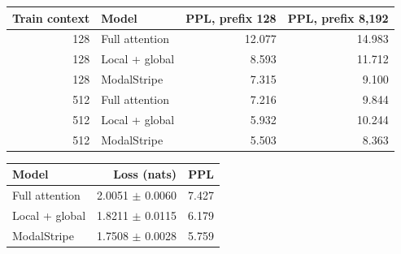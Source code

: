 \documentclass[11pt,letterpaper]{article}
\begin{document}
\begin{center}\begin{minipage}{\textwidth}\centering\small
{}

\begin{tabular}{rlrr}\toprule
Train context & Model & PPL, prefix 128 & PPL, prefix 8,192\\\midrule
128 & Full attention & 12.077 & 14.983 \\
128 & Local + global & 8.593 & 11.712 \\
128 & ModalStripe & 7.315 & 9.100 \\
512 & Full attention & 7.216 & 9.844 \\
512 & Local + global & 5.932 & 10.244 \\
512 & ModalStripe & 5.503 & 8.363 \\
\bottomrule\end{tabular}


\end{minipage}\end{center}

\begin{center}\begin{minipage}{\textwidth}\centering\small
{}

\begin{tabular}{lrr}\toprule
Model & Loss (nats) & PPL\\\midrule
Full attention & 2.0051 $\pm$ 0.0060 & 7.427 \\
Local + global & 1.8211 $\pm$ 0.0115 & 6.179 \\
ModalStripe & 1.7508 $\pm$ 0.0028 & 5.759 \\
\bottomrule\end{tabular}


\end{minipage}\end{center}
\end{document}
